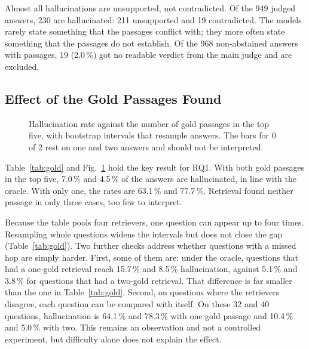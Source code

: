 Almost all hallucinations are unsupported, not contradicted. Of the 949 judged answers, 230 are hallucinated: 211
unsupported and 19 contradicted. The models rarely state something that the passages conflict with; they more often
state something that the passages do not establish. Of the 968 non-abstained answers with passages, 19 (2.0\,\%) got
no readable verdict from the main judge and are excluded.

\subsection{Effect of the Gold Passages Found}

\begin{table}[htbp]
\centering\small
\caption{Hallucination by the number of gold passages among the five passages shown to the model (the four
retrievers pooled; the oracle separately). No rate is given for 0 of 2, which rests on one and two answers. CI
(answers) resamples answers and is too narrow for pooled rows; CI (questions) resamples whole
questions.}\label{tab:gold}

\end{table}

\begin{figure}[htbp]
\centering
{}
\caption{Hallucination rate against the number of gold passages in the top five, with bootstrap intervals that
resample answers. The bars for 0 of 2 rest on one and two answers and should not be interpreted.}\label{fig:gold}
\end{figure}

Table~\ref{tab:gold} and Fig.~\ref{fig:gold} hold the key result for RQ1. With both gold passages in the top five,
7.0\,\% and 4.5\,\% of the answers are hallucinated, in line with the oracle. With only one, the rates are 63.1\,\%
and 77.7\,\%. Retrieval found neither passage in only three cases, too few to interpret.

Because the table pools four retrievers, one question can appear up to four times. Resampling whole questions widens
the intervals but does not close the gap (Table~\ref{tab:gold}). Two further checks address whether questions with a
missed hop are simply harder. First, some of them are: under the oracle, questions that had a one-gold retrieval reach
15.7\,\% and 8.5\,\% hallucination, against 5.1\,\% and 3.8\,\% for questions that had a two-gold retrieval. That
difference is far smaller than the one in Table~\ref{tab:gold}. Second, on questions where the retrievers disagree,
each question can be compared with itself. On these 32 and 40 questions, hallucination is 64.1\,\% and 78.3\,\% with
one gold passage and 10.4\,\% and 5.0\,\% with two. This remains an observation and not a controlled experiment, but
difficulty alone does not explain the effect.

